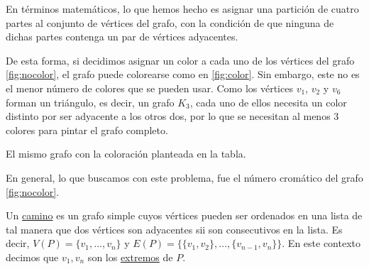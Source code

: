 \begin{prob}
    En términos matemáticos, lo que hemos hecho es asignar una partición de cuatro partes al conjunto de vértices del grafo, con la condición de que ninguna de dichas partes contenga un par de vértices adyacentes.
    
    De esta forma, si decidimos asignar un color a cada uno de los vértices del grafo \ref{fig:nocolor}, el grafo puede colorearse como en \ref{fig:color}. Sin embargo, este no es el menor número de colores que se pueden usar. Como los vértices $v_1$, $v_2$ y $v_6$ forman un triángulo, es decir, un grafo $K_3$, cada uno de ellos necesita un color distinto por ser adyacente a los otros dos, por lo que se necesitan al menos $3$ colores para pintar el grafo completo.
    
    \begin{marginfigure}
        \centering
        \caption{El mismo grafo con la coloración planteada en la tabla.}
        \label{fig:color}
    \end{marginfigure}
    
    En general, lo que buscamos con este problema, fue el número cromático del grafo \ref{fig:nocolor}.
\end{prob}

\begin{defn}
    Un \ul{camino} es un grafo simple cuyos vértices pueden ser ordenados en una lista de tal manera que dos vértices son adyacentes sii son consecutivos en la lista. Es decir, $V(P) = \{v_1, \dots, v_n\}$ y $E(P) = \{ \{v_1,v_2\}, \dots, \{v_{n-1},v_n\} \}$. En este contexto decimos que $v_1, v_n$ son los \ul{extremos} de $P$.
\end{defn}

\begin{marginfigure}
    \centering
    \caption{}
    \label{fig:camino-ejemplo}
\end{marginfigure}

